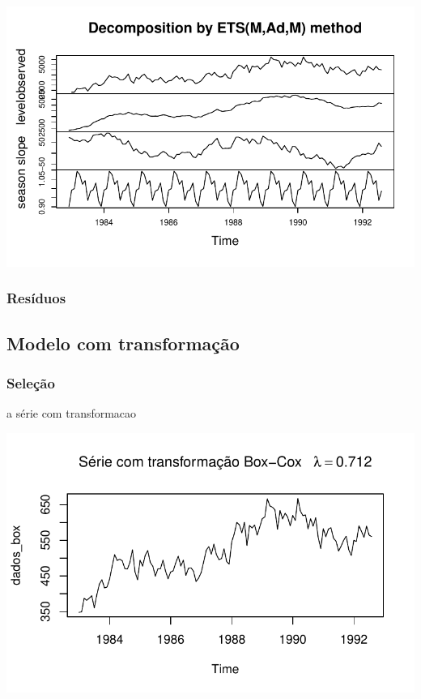 \documentclass[
  letterpaper,
  DIV=11,
  numbers=noendperiod]{scrartcl}
\begin{document}
\includegraphics{T2_grupo5_files/figure-pdf/melhor-fit-ETL-sem-transf-1.pdf}

\hypertarget{resuxedduos-2}{%
\subsubsection{Resíduos}\label{resuxedduos-2}}

\hypertarget{modelo-com-transformauxe7uxe3o-1}{%
\subsection{Modelo com
transformação}\label{modelo-com-transformauxe7uxe3o-1}}

\hypertarget{seleuxe7uxe3o-3}{%
\subsubsection{Seleção}\label{seleuxe7uxe3o-3}}

a série com transformacao

\includegraphics{T2_grupo5_files/figure-pdf/ETS-com-transf-1.pdf}
\end{document}

